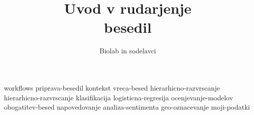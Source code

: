 \documentclass[symmetric, justified, a4paper]{tufte-book}
\title{Uvod v rudarjenje\\ besedil}
\author[Biolab in sodelavci]{Biolab in sodelavci}
\begin{document}
\frontmatter

\maketitle



\tableofcontents

% 

\mainmatter



{workflows}
{priprava-besedil}
{kontekst}
{vreca-besed}
{hierarhicno-razvrscanje}
{hierarhicno-razvrscanje}
{klasifikacija}
{logisticna-regresija}
{ocenjevanje-modelov}
{obogatitev-besed}
{napovedovanje}
{analiza-sentimenta}
{geo-oznacevanje}
{moji-podatki}


\backmatter




\printindex
\end{document}
